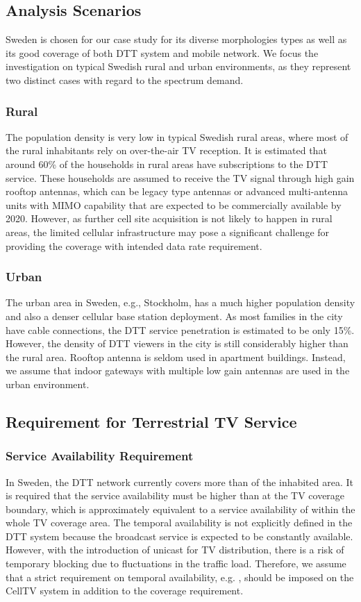\documentclass[journal]{IEEEtran}
\begin{document}
\subsection{Analysis Scenarios}
Sweden is chosen for our case study for its diverse morphologies types as well as its good coverage of both DTT system and mobile network. We focus the investigation on typical Swedish rural and urban environments, as they represent two distinct cases with regard to the spectrum demand.
\subsubsection{\textbf{Rural}}
 The population density is very low in typical Swedish rural areas, where most of the rural inhabitants rely on over-the-air TV reception. It is estimated that around 60\% of the households in rural areas have subscriptions to the DTT service\cite{Tera}. These households are assumed to receive the TV signal through high gain rooftop antennas, which can be legacy type antennas or advanced multi-antenna units with MIMO capability that are expected to be commercially available by 2020. However, as further cell site acquisition is not likely to happen in rural areas, the limited cellular infrastructure may pose a significant challenge for providing the coverage with intended data rate requirement.


\subsubsection{\textbf{Urban}}
The urban area in Sweden, e.g., Stockholm, has a much higher population density and also a denser cellular base station deployment. As most families in the city have cable connections, the DTT service penetration is estimated to be only 15\%\cite{PTS1}. However, the density of DTT viewers in the city is still considerably higher than the rural area. Rooftop antenna is seldom used in apartment buildings. Instead, we assume that indoor gateways with multiple low gain antennas are used in the urban environment.

\subsection{Requirement for Terrestrial TV Service} \label{sec:TV_model}
\subsubsection{\textbf{Service Availability Requirement}}
In Sweden, the DTT network currently covers more than  of the inhabited area. It is required that the service availability must be higher than  at the TV coverage boundary, which is approximately equivalent to a service availability of  within the whole TV coverage area.
The temporal availability is not explicitly defined in the DTT system because the broadcast service is expected to be constantly available. However, with the introduction of unicast for TV distribution, there is a risk of temporary blocking due to fluctuations in the traffic load. Therefore, we assume that a strict requirement on temporal availability, e.g. , should be imposed on the CellTV system in addition to the coverage requirement.
\end{document}
